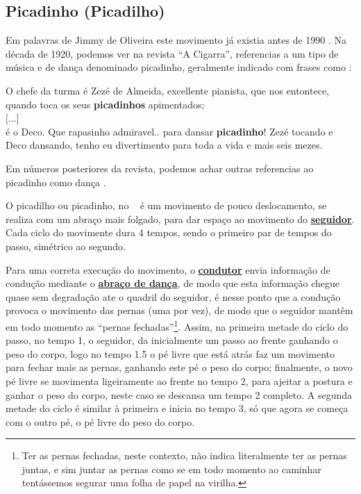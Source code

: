 \subsection{ Picadinho (Picadilho)}


Em palavras de Jimmy de Oliveira este movimento já existia antes de 1990 \cite{sambafunkeadoJimmyDeOliveiraPart1}.
Na década de 1920, podemos ver na revista ``A Cigarra'', 
referencias a um tipo de música e de dança denominado picadinho,
geralmente indicado com frases como \cite[pp. 13]{picadinho1}:
\begin{citando}
O chefe da turma é Zezé de Almeida, excellente pianista,
que nos entontece, quando toca os seus \textbf{picadinhos} apimentados;~\\
$[$...$]$~\\
é o Deco. Que rapasinho admiravel.. para dansar \textbf{picadinho}! 
Zezé tocando e Deco dansando, tenho eu divertimento 
para toda a vida e mais seis mezes.
\end{citando}
Em números posteriores da revista, 
podemos achar outras referencias ao picadinho como dança \cite[pp. 52]{picadinho2} \cite[pp. 49]{picadinho3}.

O picadilho ou picadinho, no \AnoLivro~ é um movimento de pouco deslocamento, 
se realiza com um abraço mais folgado, 
para dar espaço ao movimento do \hyperref[def:Seguidor]{\textbf{seguidor}}.
Cada ciclo do movimente dura 4 tempos, sendo o primeiro par de tempos do passo, simétrico ao segundo.


Para uma correta execução do movimento, 
o \hyperref[def:Condutor]{\textbf{condutor}} envia informação de condução mediante o \hyperref[def:abracodedanca]{\textbf{abraço de dança}},
de modo que esta informação chegue quase sem degradação ate o quadril do seguidor,
é nesse ponto que a condução provoca o movimento das pernas (uma por vez), de modo que
o seguidor mantêm em todo momento as ``pernas fechadas''\footnote{
Ter as pernas fechadas, neste contexto, não indica literalmente ter as pernas juntas, 
e sim juntar as pernas como se em todo momento ao caminhar tentássemos segurar uma folha de papel na virilha.}.
Assim, na primeira metade do ciclo do passo, no tempo 1, o seguidor,
da inicialmente um passo ao frente ganhando o peso do corpo, 
logo no tempo 1.5 o pé livre que está atrás faz um movimento para fechar mais as pernas, 
ganhando este pé o peso do corpo; finalmente, o novo pé livre se movimenta ligeiramente ao frente no tempo 2, 
para ajeitar a postura e ganhar o peso do corpo, neste caso se descansa um tempo 2 completo.
A segunda metade do ciclo é similar à primeira e inicia no tempo 3, só que agora se começa com o outro pé, 
o pé livre do peso do corpo.


